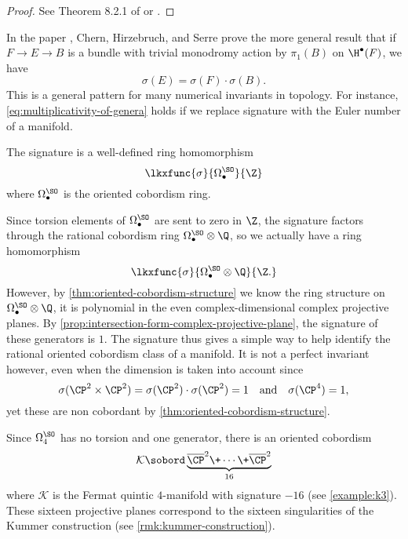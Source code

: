 \begin{proof}
	See Theorem 8.2.1 of \cite{hirzebruch1966methods} or \cite{chernhirzserre1957index}.
\end{proof}

\begin{remark}
	In the paper \cite{chernhirzserre1957index}, Chern, Hirzebruch, and Serre prove the more general result that if $F \to E \to B$ is a bundle with trivial monodromy action by $\pi_1(B)$ on $\H^\bullet(F)$, we have
	\begin{equation}\label{eq:multiplicativity-of-genera}
		\sigma(E) = \sigma(F)\cdot \sigma(B).
	\end{equation}
	This is a general pattern for many numerical invariants in topology. For instance, \cref{eq:multiplicativity-of-genera} holds if we replace signature with the Euler number of a manifold.
\end{remark}

\begin{corollary}
	The signature is a well-defined ring homomorphism
	\[
		\lkxfunc{\sigma}{\Omega^\SO_\bullet}{\Z}
	\]
	where $\Omega^\SO_\bullet$ is the oriented cobordism ring.
\end{corollary}

Since torsion elements of $\Omega^\SO_\bullet$ are sent to zero in $\Z$, the signature factors through the rational cobordism ring $\Omega^\SO_\bullet\otimes \Q$, so we actually have a ring homomorphism
\[
	\lkxfunc{\sigma}{\Omega^\SO_\bullet\otimes \Q}{\Z.}
\]
However, by \cref{thm:oriented-cobordism-structure} we know the ring structure on $\Omega^\SO_\bullet\otimes \Q$, it is polynomial in the even complex-dimensional complex projective planes. By \cref{prop:intersection-form-complex-projective-plane}, the signature of these generators is $1$. The signature thus gives a simple way to help identify the rational oriented cobordism class of a manifold. It is not a perfect invariant however, even when the dimension is taken into account since
\[
		\sigma(\CP^2\times\CP^2) = \sigma(\CP^2)\cdot \sigma(\CP^2)= 1\quad\textrm{and}\quad \sigma(\CP^4)=1,
\]
yet these are non cobordant by \cref{thm:oriented-cobordism-structure}.

\begin{example}
	Since $\Omega^\SO_4$ has no torsion and one generator, there is an oriented cobordism
	\[
		\mathcal{K} \sobord \underbrace{\overline{\CP}^2\+\cdots\+\overline{\CP}^2}_{16}
	\]
	where $\mathcal{K}$ is the Fermat quintic $4$-manifold with signature $-16$ (see \cref{example:k3}). These sixteen projective planes correspond to the sixteen singularities of the Kummer construction (see \cref{rmk:kummer-construction}).
\end{example}

